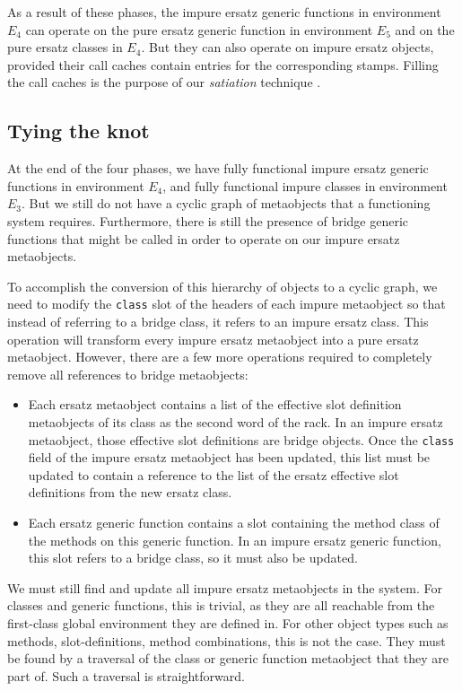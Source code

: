 As a result of these phases, the impure ersatz generic functions in
environment $E_4$ can operate on the pure ersatz generic function in
environment $E_5$ and on the pure ersatz classes in $E_4$.  But they
can also operate on impure ersatz objects, provided their call caches
contain entries for the corresponding stamps.  Filling the call caches
is the purpose of our \emph{satiation} technique
\cite{Strandh:2014:RMI:2635648.2635656}.

\subsection{Tying the knot}

At the end of the four phases, we have fully functional impure ersatz
generic functions in environment $E_4$, and fully functional impure
classes in environment $E_3$.  But we still do not have a cyclic graph
of metaobjects that a functioning \clos{} system requires.
Furthermore, there is still the presence of bridge generic functions
that might be called in order to operate on our impure ersatz
metaobjects.

To accomplish the conversion of this hierarchy of objects to a cyclic
graph, we need to modify the \texttt{class} slot of the headers of
each impure metaobject so that instead of referring to a bridge class,
it refers to an impure ersatz class.  This operation will transform
every impure ersatz metaobject into a pure ersatz metaobject.
However, there are a few more operations required to completely remove
all references to bridge metaobjects:

\begin{itemize}
\item Each ersatz metaobject contains a list of the effective slot
  definition metaobjects of its class as the second word of the rack.
  In an impure ersatz metaobject, those effective slot definitions are
  bridge objects.  Once the \texttt{class} field of the impure ersatz
  metaobject has been updated, this list must be updated to contain a
  reference to the list of the ersatz effective slot definitions from
  the new ersatz class.
\item Each ersatz generic function contains a slot containing the
  method class of the methods on this generic function.  In an impure
  ersatz generic function, this slot refers to a bridge class, so it
  must also be updated.
\end{itemize}

We must still find and update all impure ersatz metaobjects in the
system.  For classes and generic functions, this is trivial, as they
are all reachable from the first-class global environment they are
defined in.  For other object types such as methods, slot-definitions,
method combinations, this is not the case.  They must be found by
a traversal of the class or generic function metaobject that they are
part of.  Such a traversal is straightforward.

